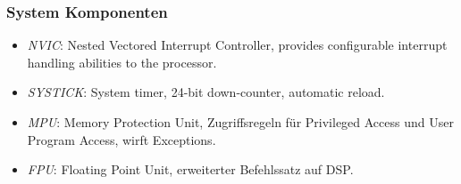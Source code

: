 \subsubsection{System Komponenten}

\begin{itemize}
	\itemsep-.5em 
	\item \textit{NVIC}: Nested Vectored Interrupt Controller, provides configurable interrupt handling abilities to the processor.
	\item \textit{SYSTICK}: System timer, 24-bit down-counter, automatic reload.
	\item \textit{MPU}: Memory Protection Unit, Zugriffsregeln für Privileged Access und User Program Access, wirft Exceptions.
	\item \textit{FPU}: Floating Point Unit, erweiterter Befehlssatz auf DSP.
\end{itemize}
